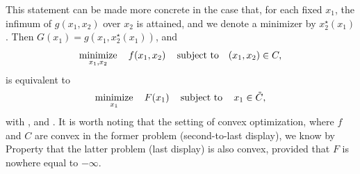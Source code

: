 This statement can be made more concrete in the case that, for each fixed $x_1$,
the infimum of $g(x_1,x_2)$ over $x_2$ is attained, and we denote a
minimizer by $x^\star_2(x_1)$. Then $G(x_1) = g(x_1, x^\star_2(x_1))$, and 
\[
\operatorname*{minimize}_{x_1,x_2} \quad f(x_1, x_2) \quad \operatorname{subject\,\,to} \quad (x_1,x_2) \in C, 
\]
is equivalent to 
\[
\operatorname*{minimize}_{x_1} \quad F(x_1) \quad \operatorname{subject\,\,to} \quad x_1 \in \tilde{C},
\]
with , and . It is worth noting that the setting of convex
optimization, where $f$ and $C$ are convex in the former problem (second-to-last  
display), we know by Property  that the latter
problem (last display) is also convex, provided that $F$ is nowhere equal to
$-\infty$.  

